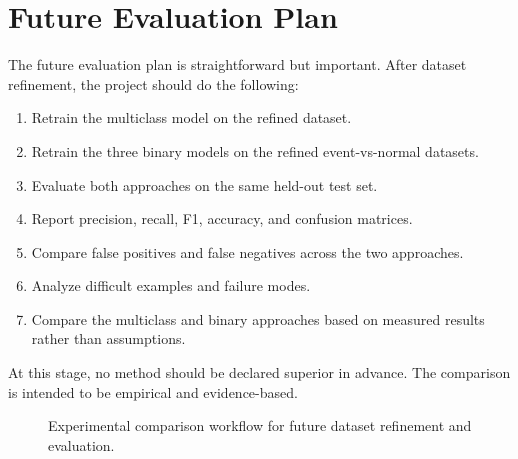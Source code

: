 \documentclass[11pt,a4paper]{article}
\begin{document}
\section{Future Evaluation Plan}
The future evaluation plan is straightforward but important. After dataset refinement, the project should do the following:
\begin{enumerate}[leftmargin=1.5em]
    \item Retrain the multiclass model on the refined dataset.
    \item Retrain the three binary models on the refined event-vs-normal datasets.
    \item Evaluate both approaches on the same held-out test set.
    \item Report precision, recall, F1, accuracy, and confusion matrices.
    \item Compare false positives and false negatives across the two approaches.
    \item Analyze difficult examples and failure modes.
    \item Compare the multiclass and binary approaches based on measured results rather than assumptions.
\end{enumerate}
At this stage, no method should be declared superior in advance. The comparison is intended to be empirical and evidence-based.

\begin{figure}[h]
\centering
{}
\caption{Experimental comparison workflow for future dataset refinement and evaluation.}
\label{fig:comparison-workflow}
\end{figure}
\end{document}
